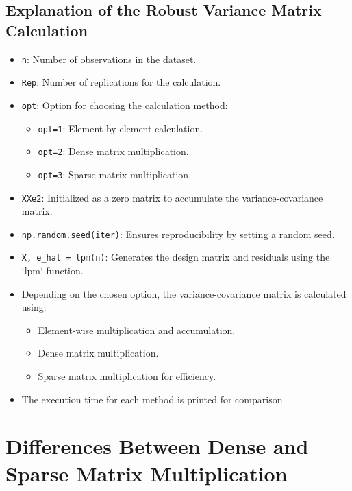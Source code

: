 \documentclass{article}
\begin{document}
\subsection{Explanation of the Robust Variance Matrix Calculation}
\begin{itemize}
    \item \texttt{n}: Number of observations in the dataset.
    \item \texttt{Rep}: Number of replications for the calculation.
    \item \texttt{opt}: Option for choosing the calculation method:
        \begin{itemize}
            \item \texttt{opt=1}: Element-by-element calculation.
            \item \texttt{opt=2}: Dense matrix multiplication.
            \item \texttt{opt=3}: Sparse matrix multiplication.
        \end{itemize}
    \item \texttt{XXe2}: Initialized as a zero matrix to accumulate the variance-covariance matrix.
    \item \texttt{np.random.seed(iter)}: Ensures reproducibility by setting a random seed.
    \item \texttt{X, e\_hat = lpm(n)}: Generates the design matrix and residuals using the `lpm` function.
    \item Depending on the chosen option, the variance-covariance matrix is calculated using:
        \begin{itemize}
            \item Element-wise multiplication and accumulation.
            \item Dense matrix multiplication.
            \item Sparse matrix multiplication for efficiency.
        \end{itemize}
    \item The execution time for each method is printed for comparison.
\end{itemize}

\section{Differences Between Dense and Sparse Matrix Multiplication}
\end{document}
